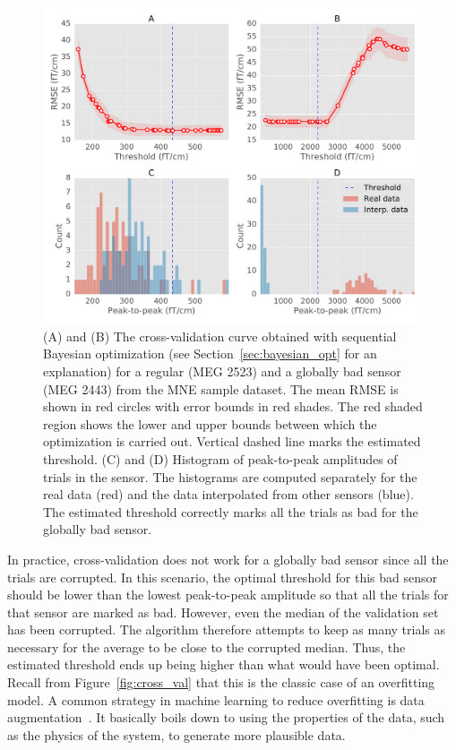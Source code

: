 \begin{figure}[ht!]
    \centering
    \includegraphics[width=0.7\linewidth]{figures/figure2.pdf}
    \caption[Sequential Bayesian optimization cross-validation curves]{(A) and (B) The cross-validation curve obtained with sequential Bayesian optimization (see Section~\ref{sec:bayesian_opt} for an explanation) for a regular (MEG 2523) and a globally bad sensor (MEG 2443) from the MNE sample dataset. The mean \ac{RMSE} is shown in red circles with error bounds in red shades. The red shaded region shows the lower and upper bounds between which the optimization is carried out. Vertical dashed line marks the estimated threshold. (C) and (D) Histogram of peak-to-peak amplitudes of trials in the sensor. The histograms are computed separately for the real data (red) and the data interpolated from other sensors (blue). The estimated threshold correctly marks all the trials as bad for the globally bad sensor.}
    \label{fig:cross_val_hist}
\end{figure}

In practice, cross-validation does not work for a globally bad sensor since all the trials are corrupted. In this scenario, the optimal threshold for this bad sensor should be lower than the lowest peak-to-peak amplitude so that all the trials for that sensor are marked as bad. However, even the median of the validation set has been corrupted. The algorithm therefore attempts to keep as many trials as necessary for the average to be close to the corrupted median. Thus, the estimated threshold ends up being higher than what would have been optimal. Recall from Figure~\ref{fig:cross_val} that this is the classic case of an overfitting model. A common strategy in machine learning to reduce overfitting is data augmentation~\citep{krizhevsky2012imagenet}. It basically boils down to using the properties of the data, such as the physics of the system, to generate more plausible data.

